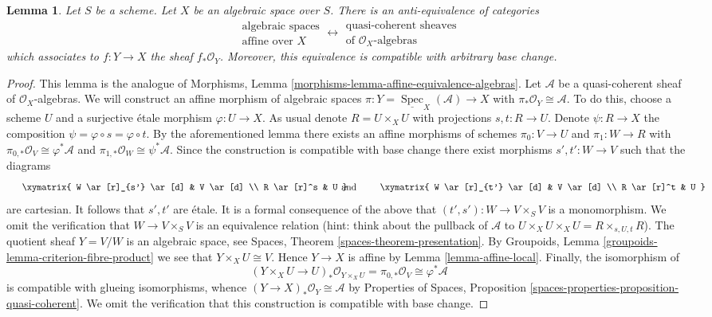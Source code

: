 \documentclass{stacks-project}
\theoremstyle{plain}
\newtheorem{lemma}[subsection]{Lemma}
\theoremstyle{definition}
\theoremstyle{remark}
\numberwithin{equation}{subsection}
\def\Spec{\mathop{\mathrm{Spec}}}
\begin{document}
\begin{lemma}
\label{lemma-affine-equivalence-algebras}
Let $S$ be a scheme. Let $X$ be an algebraic space over $S$.
There is an anti-equivalence of categories
$$
\begin{matrix}
\text{algebraic spaces} \\
\text{affine over }X
\end{matrix}
\longleftrightarrow
\begin{matrix}
\text{quasi-coherent sheaves} \\
\text{of }\mathcal{O}_X\text{-algebras}
\end{matrix}
$$
which associates to $f : Y \to X$ the sheaf $f_*\mathcal{O}_Y$.
Moreover, this equivalence is compatible with arbitrary base change.
\end{lemma}

\begin{proof}
This lemma is the analogue of Morphisms, Lemma
\ref{morphisms-lemma-affine-equivalence-algebras}.
Let $\mathcal{A}$ be a quasi-coherent sheaf of $\mathcal{O}_X$-algebras.
We will construct an affine morphism of algebraic spaces
$\pi : Y = \underline{\Spec}_X(\mathcal{A}) \to X$ with
$\pi_*\mathcal{O}_Y \cong \mathcal{A}$. To do this, choose a scheme
$U$ and a surjective \'etale morphism $\varphi : U \to X$. As usual
denote $R = U \times_X U$ with projections $s, t : R \to U$. Denote
$\psi : R \to X$ the composition $\psi = \varphi \circ s = \varphi \circ t$.
By the aforementioned lemma there exists an affine morphisms of schemes
$\pi_0 : V \to U$ and $\pi_1 : W \to R$ with
$\pi_{0, *}\mathcal{O}_V \cong \varphi^*\mathcal{A}$ and
$\pi_{1, *}\mathcal{O}_W \cong \psi^*\mathcal{A}$.
Since the construction is compatible with base change there exist
morphisms $s', t' : W \to V$ such that the diagrams
$$
\vcenter{
\xymatrix{
W \ar[r]_{s'} \ar[d] & V \ar[d] \\
R \ar[r]^s & U
}
}
\quad\text{and}\quad
\vcenter{
\xymatrix{
W \ar[r]_{t'} \ar[d] & V \ar[d] \\
R \ar[r]^t & U
}
}
$$
are cartesian. It follows that $s', t'$ are \'etale. It is a formal
consequence of the above that $(t', s') : W \to V \times_S V$ is a
monomorphism. We omit the verification that $W \to V \times_S V$ is an
equivalence relation (hint: think about the pullback of $\mathcal{A}$
to $U \times_X U \times_X U = R \times_{s, U, t} R$).
The quotient sheaf $Y = V/W$
is an algebraic space, see
Spaces, Theorem \ref{spaces-theorem-presentation}.
By Groupoids, Lemma \ref{groupoids-lemma-criterion-fibre-product}
we see that $Y \times_X U \cong V$. Hence $Y \to X$ is affine by
Lemma \ref{lemma-affine-local}. Finally, the isomorphism of
$$
(Y \times_X U \to U)_*\mathcal{O}_{Y \times_X U} =
\pi_{0, *}\mathcal{O}_V \cong \varphi^*\mathcal{A}
$$
is compatible with glueing isomorphisms, whence
$(Y \to X)_*\mathcal{O}_Y \cong \mathcal{A}$ by
Properties of Spaces, Proposition
\ref{spaces-properties-proposition-quasi-coherent}.
We omit the verification that this construction is compatible with
base change.
\end{proof}
\end{document}
